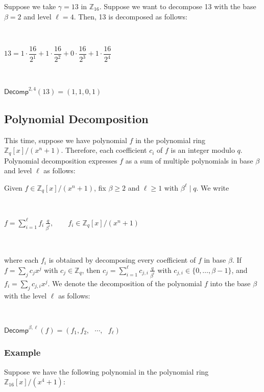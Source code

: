 Suppose we take $\gamma=13$ in $\mathbb{Z}_{16}$. Suppose we want to decompose 13 with the base $\beta = 2$ and level $\ell = 4$. Then, 13 is decomposed as follows:

$ $

$13 = 1 \cdot \dfrac{16}{2^1} + 1 \cdot \dfrac{16}{2^2} + 0 \cdot \dfrac{16}{2^3} + 1 \cdot \dfrac{16}{2^4}$

$ $

$\textsf{Decomp}^{2, 4}(13) = (1, 1, 0, 1)$


\subsection{Polynomial Decomposition}
\label{subsec:poly-decomp}

This time, suppose we have polynomial $f$ in the polynomial ring ${\mathbb{Z}_q[x] / (x^n + 1)}$. Therefore, each coefficient $c_i$ of $f$ is an integer modulo $q$. Polynomial decomposition expresses $f$ as a sum of multiple polynomials in base $\beta$ and level $\ell$ as follows:


\begin{tcolorbox}[title={\textbf{\tboxlabel{\ref*{subsec:poly-decomp}} Polynomial Decomposition}}]

Given $f\in \mathbb{Z}_q[x]/(x^n+1)$, fix $\beta\ge 2$ and $\ell\ge 1$ with $\beta^\ell\mid q$. We write

$ $

$f=\sum_{i=1}^{\ell} f_i\,\frac{q}{\beta^i}, \qquad f_i\in \mathbb{Z}_q[x]/(x^n+1)  $

$ $

where each $f_i$ is obtained by decomposing every coefficient of $f$ in base $\beta$. If $f=\sum_j c_j x^j$ with $c_j\in\mathbb{Z}_q$, then
$c_j=\sum_{i=1}^{\ell} c_{j,i}\, \frac{q}{\beta^i}$ with $c_{j,i}\in\{0,\ldots,\beta-1\}$,
and $f_i=\sum_j c_{j,i} x^j$.
We denote the decomposition of the polynomial $f$ into the base $\beta$ with the level $\ell$ as follows:

$ $

$\textsf{Decomp}^{\beta, \ell}(f) = (f_1, f_2, \text{ } \cdots , \text{ } f_\ell)$
 $ $
\end{tcolorbox}




\subsubsection{Example}

Suppose we have the following polynomial in the polynomial ring $\mathbb{Z}_{16}[x] / (x^4 + 1)$:

